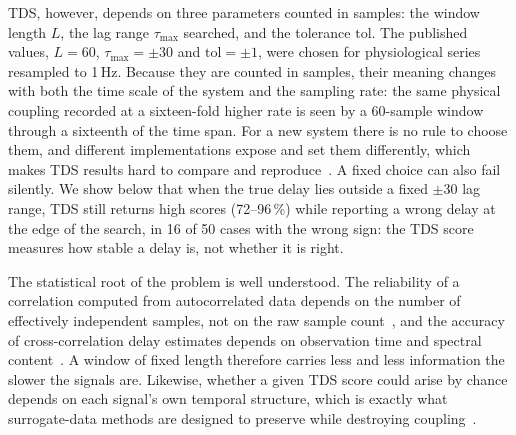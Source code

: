 \documentclass[11pt,a4paper]{article}
\begin{document}
TDS, however, depends on three parameters counted in samples: the window length $L$, the lag range $\tau_{\max}$ searched, and the tolerance $\mathrm{tol}$. The published values, $L = 60$, $\tau_{\max} = \pm 30$ and $\mathrm{tol} = \pm 1$, were chosen for physiological series resampled to 1\,Hz. Because they are counted in samples, their meaning changes with both the time scale of the system and the sampling rate: the same physical coupling recorded at a sixteen-fold higher rate is seen by a 60-sample window through a sixteenth of the time span. For a new system there is no rule to choose them, and different implementations expose and set them differently, which makes TDS results hard to compare and reproduce~\cite{Steinbrinker2024TdspyOpensource}. A fixed choice can also fail silently. We show below that when the true delay lies outside a fixed $\pm30$ lag range, TDS still returns high scores (72--96\,\%) while reporting a wrong delay at the edge of the search, in 16 of 50 cases with the wrong sign: the TDS score measures how stable a delay is, not whether it is right.

The statistical root of the problem is well understood. The reliability of a correlation computed from autocorrelated data depends on the number of effectively independent samples, not on the raw sample count~\cite{Bartlett1946TheoreticalSpecification,Bayley1946EffectiveNumber,Pyper1998ComparisonMethods,Afyouni2019EffectiveDegrees}, and the accuracy of cross-correlation delay estimates depends on observation time and spectral content~\cite{Knapp1976GeneralizedCorrelation,Carter1987CoherenceTime}. A window of fixed length therefore carries less and less information the slower the signals are. Likewise, whether a given TDS score could arise by chance depends on each signal's own temporal structure, which is exactly what surrogate-data methods are designed to preserve while destroying coupling~\cite{Theiler1992TestingNonlinearity,Schreiber2000SurrogateTime,Lancaster2018SurrogateData}.
\end{document}
